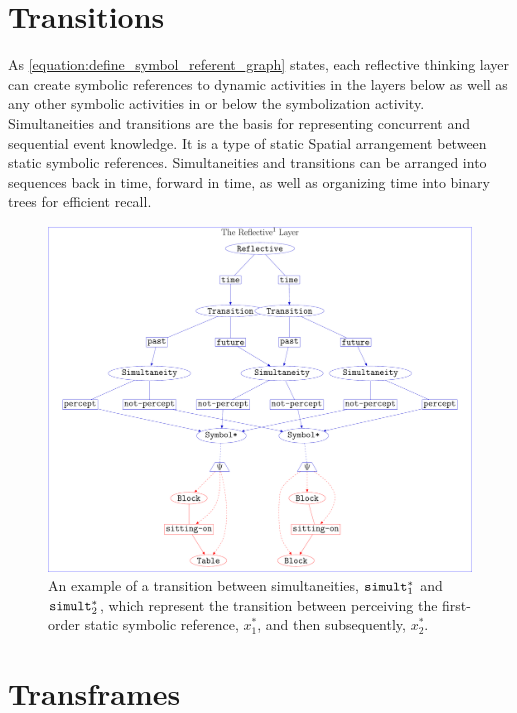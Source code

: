 \section{Transitions}

As {\mbox{\autoref{equation:define_symbol_referent_graph}}} states,
each reflective thinking layer can create symbolic references to
dynamic activities in the layers below as well as any other symbolic
activities in or below the symbolization activity.  Simultaneities and
transitions are the basis for representing concurrent and sequential
event knowledge.  It is a type of static Spatial arrangement between
static symbolic references.  Simultaneities and transitions can be
arranged into sequences back in time, forward in time, as well as
organizing time into binary trees for efficient recall.
\begin{figure}
\center
\includegraphics[width=12cm]{gfx/example_transition}
\caption[An example of a transition between simultaneities.]{An
  example of a transition between simultaneities,
  $\text{\tt{simult}}_1^*$ and $\text{\tt{simult}}_2^*$, which
  represent the transition between perceiving the first-order static
  symbolic reference, $x_1^*$, and then subsequently, $x_2^*$.}
\label{figure:example_transition}
\end{figure}

\section{Transframes}

